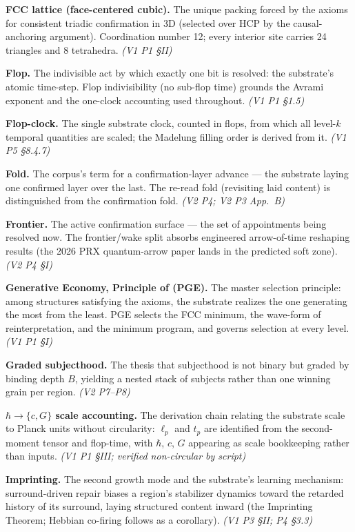 \documentclass[11pt,oneside]{report}
\theoremstyle{definition}
\theoremstyle{remark}
\begin{document}
\textbf{FCC lattice (face-centered cubic).} The unique packing forced by the axioms for consistent triadic confirmation in 3D (selected over HCP by the causal-anchoring argument). Coordination number 12; every interior site carries 24 triangles and 8 tetrahedra. \emph{(V1 P1 \S II)}

\textbf{Flop.} The indivisible act by which exactly one bit is resolved: the substrate's atomic time-step. Flop indivisibility (no sub-flop time) grounds the Avrami exponent and the one-clock accounting used throughout. \emph{(V1 P1 \S 1.5)}

\textbf{Flop-clock.} The single substrate clock, counted in flops, from which all level-$k$ temporal quantities are scaled; the Madelung filling order is derived from it. \emph{(V1 P5 \S 8.4.7)}

\textbf{Fold.} The corpus's term for a confirmation-layer advance --- the substrate laying one confirmed layer over the last. The re-read fold (revisiting laid content) is distinguished from the confirmation fold. \emph{(V2 P4; V2 P3 App.\ B)}

\textbf{Frontier.} The active confirmation surface --- the set of appointments being resolved now. The frontier/wake split absorbs engineered arrow-of-time reshaping results (the 2026 PRX quantum-arrow paper lands in the predicted soft zone). \emph{(V2 P4 \S I)}

\textbf{Generative Economy, Principle of (PGE).} The master selection principle: among structures satisfying the axioms, the substrate realizes the one generating the most from the least. PGE selects the FCC minimum, the wave-form of reinterpretation, and the minimum program, and governs selection at every level. \emph{(V1 P1 \S I)}

\textbf{Graded subjecthood.} The thesis that subjecthood is not binary but graded by binding depth $B$, yielding a nested stack of subjects rather than one winning grain per region. \emph{(V2 P7--P8)}

\textbf{$\hbar \to \{c, G\}$ scale accounting.} The derivation chain relating the substrate scale to Planck units without circularity: $\ell_p$ and $t_p$ are identified from the second-moment tensor and flop-time, with $\hbar$, $c$, $G$ appearing as scale bookkeeping rather than inputs. \emph{(V1 P1 \S III; verified non-circular by script)}

\textbf{Imprinting.} The second growth mode and the substrate's learning mechanism: surround-driven repair biases a region's stabilizer dynamics toward the retarded history of its surround, laying structured content inward (the Imprinting Theorem; Hebbian co-firing follows as a corollary). \emph{(V1 P3 \S II; P4 \S 3.3)}
\end{document}
